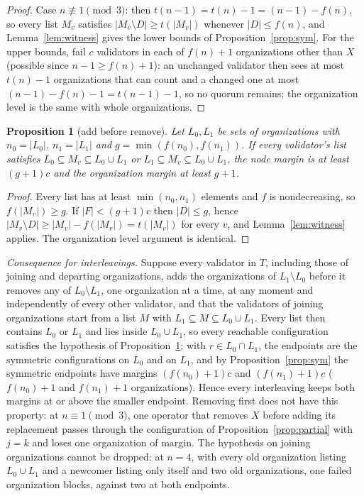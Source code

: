 \documentclass[11pt,a4paper]{article}
\newtheorem{proposition}{Proposition}
\begin{document}
\begin{proof}
Case $n\not\equiv1\pmod 3$: then $t(n-1)=t(n)-1=(n-1)-f(n)$, so every list $M_v$ satisfies $|M_v\setminus D|\ge t(|M_v|)$ whenever $|D|\le f(n)$, and Lemma~\ref{lem:witness} gives the lower bounds of Proposition~\ref{prop:sym}. For the upper bounds, fail $c$ validators in each of $f(n)+1$ organizations other than $X$ (possible since $n-1\ge f(n)+1$): an unchanged validator then sees at most $t(n)-1$ organizations that can count and a changed one at most $(n-1)-f(n)-1=t(n-1)-1$, so no quorum remains; the organization level is the same with whole organizations.
\end{proof}

\begin{proposition}[add before remove]\label{prop:order}
Let $L_0,L_1$ be sets of organizations with $n_0=|L_0|$, $n_1=|L_1|$ and $g=\min(f(n_0),f(n_1))$. If every validator's list satisfies $L_0\subseteq M_v\subseteq L_0\cup L_1$ or $L_1\subseteq M_v\subseteq L_0\cup L_1$, the node margin is at least $(g+1)c$ and the organization margin at least $g+1$.
\end{proposition}
\begin{proof}
Every list has at least $\min(n_0,n_1)$ elements and $f$ is nondecreasing, so $f(|M_v|)\ge g$. If $|F|<(g+1)c$ then $|D|\le g$, hence $|M_v\setminus D|\ge |M_v|-f(|M_v|)=t(|M_v|)$ for every $v$, and Lemma~\ref{lem:witness} applies. The organization level argument is identical.
\end{proof}

\emph{Consequence for interleavings.} Suppose every validator in $T$, including those of joining and departing organizations, adds the organizations of $L_1\setminus L_0$ before it removes any of $L_0\setminus L_1$, one organization at a time, at any moment and independently of every other validator, and that the validators of joining organizations start from a list $M$ with $L_1\subseteq M\subseteq L_0\cup L_1$. Every list then contains $L_0$ or $L_1$ and lies inside $L_0\cup L_1$, so every reachable configuration satisfies the hypothesis of Proposition~\ref{prop:order}; with $r\in L_0\cap L_1$, the endpoints are the symmetric configurations on $L_0$ and on $L_1$, and by Proposition~\ref{prop:sym} the symmetric endpoints have margins $(f(n_0)+1)c$ and $(f(n_1)+1)c$ ($f(n_0)+1$ and $f(n_1)+1$ organizations). Hence every interleaving keeps both margins at or above the smaller endpoint. Removing first does not have this property: at $n\equiv1\pmod 3$, one operator that removes $X$ before adding its replacement passes through the configuration of Proposition~\ref{prop:partial} with $j=k$ and loses one organization of margin. The hypothesis on joining organizations cannot be dropped: at $n=4$, with every old organization listing $L_0\cup L_1$ and a newcomer listing only itself and two old organizations, one failed organization blocks, against two at both endpoints.
\end{document}
